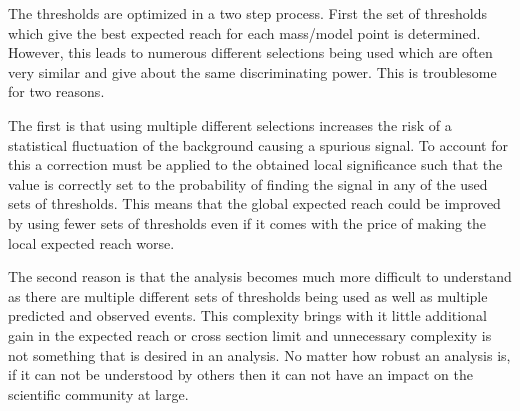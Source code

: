 

The thresholds are optimized in a two step process. First the set of thresholds which give the best expected reach for each mass/model point is determined. However, this leads
to numerous different selections being used which are often very similar and give about the same discriminating power. This is troublesome for two reasons. 

The first is that using multiple different selections increases the risk of a statistical fluctuation of the background causing a spurious signal. 
To account for this a correction
must be applied to the obtained local significance such that the value is correctly set to the probability of finding the signal in any of the used sets of thresholds. This
means that the global expected reach could be improved by using fewer sets of thresholds even if it comes with the price of making the local expected reach worse.

The second reason is that the analysis becomes much more difficult to understand as there are multiple different sets of thresholds being used as well as multiple predicted and 
observed events. This complexity brings with it little additional gain in the expected reach or cross section limit and unnecessary complexity is not something that
is desired in an analysis. No matter how robust an analysis is, if it can not be 
understood by others then it can not have an impact on the scientific community at large.

